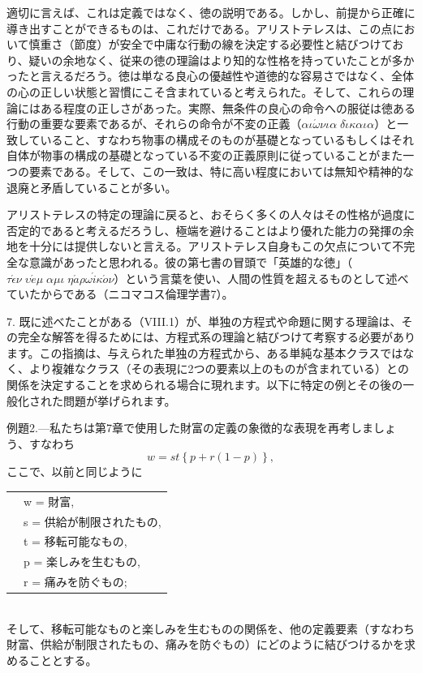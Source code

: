 \documentclass[a4paper,11pt,openany]{ltjsbook}
\begin{document}
適切に言えば、これは定義ではなく、徳の説明である。しかし、前提から正確に導き出すことができるものは、これだけである。アリストテレスは、この点において慎重さ（節度）が安全で中庸な行動の線を決定する必要性と結びつけており、疑いの余地なく、従来の徳の理論はより知的な性格を持っていたことが多かったと言えるだろう。徳は単なる良心の優越性や道徳的な容易さではなく、全体の心の正しい状態と習慣にこそ含まれていると考えられた。そして、これらの理論にはある程度の正しさがあった。実際、無条件の良心の命令への服従は徳ある行動の重要な要素であるが、それらの命令が不変の正義（$\alpha\iota\acute{\omega}\nu\iota\alpha\;\delta\acute{\iota}\kappa\alpha\iota\alpha$）と一致していること、すなわち物事の構成そのものが基礎となっているもしくはそれ自体が物事の構成の基礎となっている不変の正義原則に従っていることがまた一つの要素である。そして、この一致は、特に高い程度においては無知や精神的な退廃と矛盾していることが多い。

アリストテレスの特定の理論に戻ると、おそらく多くの人々はその性格が過度に否定的であると考えるだろうし、極端を避けることはより優れた能力の発揮の余地を十分には提供しないと言える。アリストテレス自身もこの欠点について不完全な意識があったと思われる。彼の第七書の冒頭で「英雄的な徳」（$\tau\acute{\epsilon}\nu\;\upsilon\acute{e}\mu\;\alpha\mu\iota\;\eta\acute{a}\rho\omega\acute{i}\kappa\acute{o}\nu$）という言葉を使い、人間の性質を超えるものとして述べていたからである（ニコマコス倫理学書7）。

7. 既に述べたことがある（VIII.1）が、単独の方程式や命題に関する理論は、その完全な解答を得るためには、方程式系の理論と結びつけて考察する必要があります。この指摘は、与えられた単独の方程式から、ある単純な基本クラスではなく、より複雑なクラス（その表現に2つの要素以上のものが含まれている）との関係を決定することを求められる場合に現れます。以下に特定の例とその後の一般化された問題が挙げられます。

例題2.---私たちは第7章で使用した財富の定義の象徴的な表現を再考しましょう、すなわち
\[
w = st \left\{p + r\left(1 - p\right)\right\},
\]
ここで、以前と同じように \\
\begin{tabular}{c l}
&w = 財富,\\
&s = 供給が制限されたもの,\\
&t = 移転可能なもの,\\
&p = 楽しみを生むもの,\\
&r = 痛みを防ぐもの;
\end{tabular}\\
そして、移転可能なものと楽しみを生むものの関係を、他の定義要素（すなわち財富、供給が制限されたもの、痛みを防ぐもの）にどのように結びつけるかを求めることとする。
\end{document}
